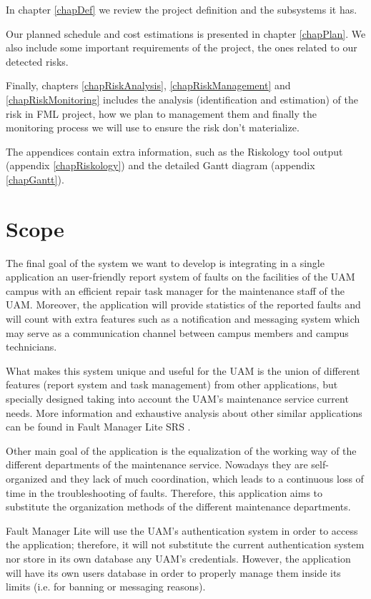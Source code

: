\documentclass[11pt]{report}
\newcounter{risks}[subsection]
\begin{document}
In chapter \ref{chapDef} we review the project definition and the subsystems it has.

Our planned schedule and cost estimations is presented in chapter \ref{chapPlan}. We also include some important requirements of the project, the ones related to our detected risks.

Finally, chapters \ref{chapRiskAnalysis}, \ref{chapRiskManagement} and \ref{chapRiskMonitoring} includes the analysis (identification and estimation) of the risk in FML project, how we plan to management them and finally the monitoring process we will use to ensure the risk don't materialize.

The appendices contain extra information, such as the Riskology tool output (appendix \ref{chapRiskology}) and the detailed Gantt diagram (appendix \ref{chapGantt}).

\section{Scope}

The final goal of the system we want to develop is integrating in a single application an user-friendly report system of faults on the facilities of the UAM campus with an efficient repair task manager for the maintenance staff of the UAM. Moreover, the application will provide statistics of the reported faults and will count with extra features such as a notification and messaging system which may serve as a communication channel between campus members and campus technicians.

What makes this system unique and useful for the UAM is the union of different features (report system and task management) from other applications, but specially designed taking into account the UAM's maintenance service current needs. More information and exhaustive analysis about other similar applications can be found in Fault Manager Lite SRS \cite{requirements15}.

Other main goal of the application is the equalization of the working way of the different departments of the maintenance service. Nowadays they are self-organized and they lack of much coordination, which leads to a continuous loss of time in the troubleshooting of faults. Therefore, this application aims to substitute the organization methods of the different maintenance departments.

Fault Manager Lite will use the UAM's authentication system in order to access the application; therefore, it will not substitute the current authentication system nor store in its own database any UAM's credentials. However, the application will have its own users database in order to properly manage them inside its limits (i.e. for banning or messaging reasons).
\end{document}
